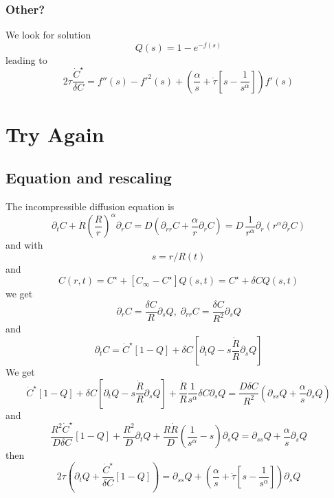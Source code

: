\documentclass[11pt]{revtex4}
\begin{document}
\subsubsection{Other?}
We look for solution
\begin{equation}
	Q(s) = 1 - e^{-f(s)}
\end{equation}
leading to
\begin{equation}
	2\tau \dfrac{\dot{C}^\star}{\delta C} = f''(s) - f'^2(s) + \left( \dfrac{\alpha}{s} + \dot{\tau} \left[s-\dfrac{1}{s^\alpha}\right]\right) f'(s)
\end{equation}

\section{Try Again}

\subsection{Equation and rescaling}
The incompressible diffusion equation is
\begin{equation}
	\partial_t C + \dot{R} \left(\dfrac{R}{r}\right)^\alpha  \partial_r C = D \left( \partial_{rr} C + \dfrac{\alpha}{r} \partial_r C \right) = D \, \dfrac{1}{r^\alpha} \partial_r \left(r^\alpha\partial_r C\right)
\end{equation}
and
with 
\begin{equation}
	s = r/R(t)
\end{equation}
and
\begin{equation}
	C(r,t) = C^\star + \left[C_\infty-C^\star\right] Q(s,t) = C^\star + \delta C Q(s,t)
\end{equation}
we get
\begin{equation}
	\partial_r C = \dfrac{\delta C}{R} \partial_s Q, \; \partial_{rr} C = \dfrac{\delta C}{R^2} \partial_s Q
\end{equation}
and
\begin{equation}
	\partial_t C = \dot{C}^\star \left[1-Q\right] + \delta C \left[\partial_t Q - s \dfrac{\dot{R}}{R} \partial_s Q \right]
\end{equation}
We get
\begin{equation}
	\dot{C}^\star \left[1-Q\right] + \delta C \left[\partial_t Q - s \dfrac{\dot{R}}{R} \partial_s Q \right] + \dfrac{\dot{R}}{R} \dfrac{1}{s^\alpha} \delta C \partial_s Q 
	= \dfrac{D \delta C}{R^2} \left( \partial_{ss} Q + \dfrac{\alpha}{s} \partial_s Q \right)
\end{equation}
and
\begin{equation}
  \dfrac{R^2\dot{C}^\star}{D\delta C}\left[1-Q\right] + \dfrac{R^2}{D} \partial_t Q + \dfrac{R\dot{R}}{D} \left(\dfrac{1}{s^\alpha}-s\right) \partial_s Q =   \partial_{ss} Q + \dfrac{\alpha}{s} \partial_s Q
\end{equation}
then
\begin{equation}
	2 \tau \left( \partial_t Q + \dfrac{\dot{C}^\star}{\delta C} \left[1-Q\right] \right) =
	 \partial_{ss} Q + \left( \dfrac{\alpha}{s} + \dot{\tau} \left[s - \dfrac{1}{s^\alpha} \right] \right) \partial_s Q
\end{equation}
\end{document}
